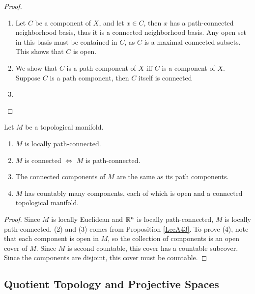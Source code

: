 \begin{proof}
    \begin{enumerate}
    \item Let $C$ be a component of $X$, and let $x \in C$, then $x$ has a path-connected neighborhood basis, thus it is a connected neighborhood basis. Any open set in this basis must be contained in $C$, as $C$ is a maximal connected subsets. This shows that $C$ is open. 
    \item We show that $C$ is a path component of $X$ iff $C$ is a component of $X$. Suppose $C$ is a path component, then $C$ itself is connected

    \item 
    \end{enumerate}
\end{proof}
\begin{proposition}
    Let $M$ be a topological manifold.
    \begin{enumerate}
        \item $M$ is locally path-connected.
        \item $M$ is connected $\iff$ $M$ is path-connected. 
        \item The connected components of $M$ are the same as its path components. 
        \item $M$ has countably many components, each of which is open and a connected topological manifold. 
    \end{enumerate}
\end{proposition}
\begin{proof}
    Since $M$ is locally Euclidean and $\mathbb{R}^n$ is locally path-connected, $M$ is locally path-connected. (2) and (3) comes from Proposition \ref{LeeA43}. 
    To prove (4), note that each component is open in $M$, so the collection of components is an open cover of $M$. Since $M$ is second countable, this cover has a countable subcover. Since the components are disjoint, this cover must be countable. 

\end{proof}


\subsection{Quotient Topology and Projective Spaces}

